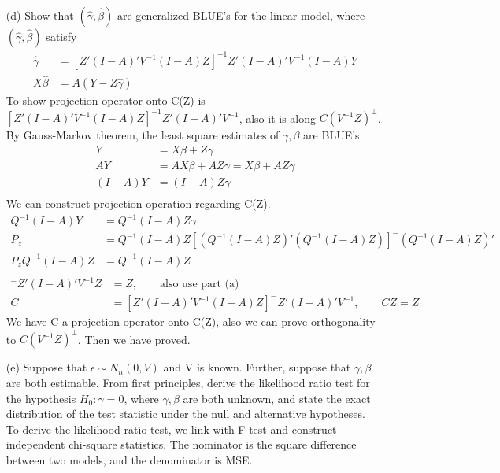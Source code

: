 \documentclass{article}
\begin{document}
\begin{itemize}
\begin{align*}
\end{align*}
\item[(d)] Show that $(\hat{\gamma}, \hat{\beta})$ are generalized BLUE's for the linear model, where $(\hat{\gamma}, \hat{\beta})$ satisfy
\begin{align*}
\hat{\gamma} &= [Z'(I-A)' V^{-1} (I-A)Z]^{-1} Z'(I-A)' V^{-1} (I-A)Y\\
X\hat{\beta} &= A(Y-Z \hat{\gamma})
\end{align*}
To show projection operator onto C(Z) is $[Z'(I-A)' V^{-1} (I-A)Z]^{-1} Z'(I-A)' V^{-1}$, also it is along $C(V^{-1} Z)^{\perp}$.\\
By Gauss-Markov theorem, the least square estimates of $\gamma, \beta$ are BLUE's. 
\begin{align*}
Y &= X\beta + Z\gamma \\
AY &= AX\beta + AZ\gamma = X\beta + AZ\gamma \\
(I-A)Y &= (I-A)Z \gamma\\
\end{align*}
We can construct projection operation regarding C(Z).
\begin{align*}
Q^{-1}(I-A)Y &= Q^{-1}(I-A)Z \gamma\\
P_z &= Q^{-1}(I-A)Z [(Q^{-1}(I-A)Z)' (Q^{-1}(I-A)Z)]^{-} (Q^{-1}(I-A)Z)' \\
P_z Q^{-1}(I-A)Z &= Q^{-1}(I-A)Z \\
\end{align*}
\begin{align*}
[Z'(I-A)'V^{-1}(I-A)Z]^{-}Z'(I-A)'V^{-1} Z&=  Z, \qquad \text{also use part (a)}\\
C &= [Z'(I-A)'V^{-1}(I-A)Z]^{-}Z'(I-A)'V^{-1}, \qquad CZ = Z
\end{align*}
We have C a projection operator onto C(Z), also we can prove orthogonality to $C(V^{-1} Z)^{\perp}$.
Then we have proved.
\item[(e)] Suppose that $\epsilon \sim N_n(0, V )$ and V is known. Further, suppose that
 $\gamma, \beta$ are both estimable. From first principles, derive the likelihood ratio test for
the hypothesis $H_0: \gamma= 0 $, where $\gamma, \beta$ are both unknown, and state the exact
distribution of the test statistic under the null and alternative hypotheses.\\
To derive the likelihood ratio test, we link with F-test and construct independent chi-square statistics. The nominator is the square difference between two models, and the denominator is MSE.\\
\begin{align*}

\end{align*}
\end{itemize}
\end{document}
